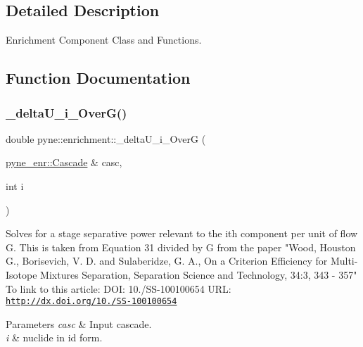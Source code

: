 \subsection{Detailed Description}
Enrichment Component Class and Functions. 

\subsection{Function Documentation}
\mbox{\label{namespacepyne_1_1enrichment_ab8f3f7b06c2d2d0ec291aaa9c0aef0f6}} 
\subsubsection{\texorpdfstring{\+\_\+delta\+U\+\_\+i\+\_\+\+Over\+G()}{\_deltaU\_i\_OverG()}}
{\footnotesize\ttfamily double pyne\+::enrichment\+::\+\_\+delta\+U\+\_\+i\+\_\+\+OverG (\begin{DoxyParamCaption}\item[{\hyperlink{classpyne_1_1enrichment_1_1_cascade}{pyne\+\_\+enr\+::\+Cascade} \&}]{casc,  }\item[{int}]{i }\end{DoxyParamCaption})}

Solves for a stage separative power relevant to the ith component per unit of flow G. This is taken from Equation 31 divided by G from the paper "Wood, Houston G., Borisevich, V. D. and Sulaberidze, G. A., \textquotesingle{}On a Criterion Efficiency for Multi-\/\+Isotope Mixtures Separation\textquotesingle{}, Separation Science and Technology, 34\+:3, 343 -\/ 357" To link to this article\+: D\+OI\+: 10./\+S\+S-\/100100654 U\+RL\+: \href{http://dx.doi.org/10.1081/SS-100100654}{\tt http\+://dx.\+doi.\+org/10./\+S\+S-\/100100654} 
\begin{DoxyParams}{Parameters}
{\em casc} & Input cascade. \\
\hline
{\em i} & nuclide in id form. \\
\hline
\end{DoxyParams}
\mbox{\label{namespacepyne_1_1enrichment_a27435bc36fca59ca85dcf17b1db17fe4}} 
